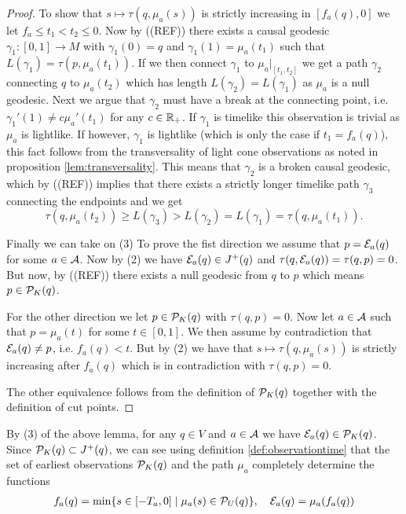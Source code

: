 \begin{proof}
To show that $s\mapsto \tau(q,\mu_a(s))$ is strictly increasing in $[f_a(q),0]$ we let $f_a\leq t_1<t_2\leq 0$. Now by ((REF)) there exists a causal geodesic $\gamma_1:[0,1]\to M$ with $\gamma_1(0)=q$ and $\gamma_1(1)=\mu_a(t_1)$ such that $L(\gamma_1)=\tau(p,\mu_a(t_1))$. 
If we then connect $\gamma_1$ to $\mu_a\rvert_{[t_1,t_2]}$ we get a path $\gamma_2$ connecting $q$ to $\mu_a(t_2)$ which has length $L(\gamma_2) = L(\gamma_1)$ as $\mu_a$ is a null geodesic. Next we argue that $\gamma_2$ must have a break at the connecting point, i.e. $\gamma_1'(1) \neq c\mu_a'(t_1)$ for any $c\in \R_+$. If $\gamma_1$ is timelike this observation is trivial as $\mu_a$ is lightlike. If however, $\gamma_1$ is lightlike (which is only the case if $t_1=f_a(q)$), this fact follows from the transversality of light cone observations as noted in proposition \ref{lem:transversality}. This means that $\gamma_2$ is a broken causal geodesic, which by ((REF)) implies that there exists a strictly longer timelike path $\gamma_3$ connecting the endpoints and we get
\[
\tau(q,\mu_a(t_2)) \geq L(\gamma_3) > L(\gamma_2) = L(\gamma_1) = \tau(q,\mu_a(t_1)).
\]

Finally we can take on (3)
To prove the fist direction we assume that $p=\mc{E}_a(q)$ for some $a\in \mc{A}$. Now by (2) we have $\mc{E}_a(q) \in J^+(q)$ and $\tau(q,\mc{E}_a(q))=\tau(q,p)=0$. But now, by ((REF)) there exists a null geodesic from $q$ to $p$ which means $p\in \mc{P}_K(q)$. 

For the other direction we let $p\in \mc{P}_K(q)$ with $\tau(q,p)=0$. Now let $a\in \mc{A}$ such that $p=\mu_a(t)$ for some $t\in [0,1]$. We then assume by contradiction that $\mc{E}_a(q) \neq p$, i.e. $f_a(q) < t$. But by (2) we have that $s\mapsto\tau(q,\mu_a(s))$ is strictly increasing after $f_a(q)$ which is in contradiction with $\tau(q,p)=0$.

The other equivalence follows from the definition of $\mc{P}_K(q)$ together with the definition of cut points.
\end{proof}

By (3) of the above lemma, for any $q\in V$ and $a\in \ca$ we have $\mc{E}_a(q)\in \P_K(q)$. Since $\P_K(q)\subset J^+(q)$, we can see using definition \ref{def:observationtime} that the set of earliest observations $\P_K(q)$ and the path $\mu_a$ completely determine the functions
\begin{align}\label{eq:observationtimerestated}
    f_a(q) = \min \{ s\in [-T_a,0] \mid \mu_a(s)\in \P_U(q) \}, \quad \mc{E}_a(q) = \mu_a(f_a(q))
\end{align}

